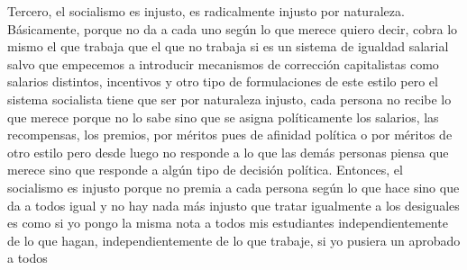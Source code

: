 Tercero, el socialismo es injusto, es radicalmente injusto por naturaleza. Básicamente, porque no da a cada uno según lo que merece quiero decir, cobra lo mismo el que trabaja que el que no trabaja si es un sistema de igualdad salarial salvo que empecemos a introducir mecanismos de corrección capitalistas como salarios distintos, incentivos y otro tipo de formulaciones de este estilo pero el sistema socialista tiene que ser por naturaleza injusto, cada persona no recibe lo que merece porque no lo sabe sino que se asigna políticamente los salarios, las recompensas, los premios, por méritos pues de afinidad política o por méritos de otro estilo pero desde luego no responde a lo que las demás personas piensa que merece sino que responde a algún tipo de decisión política. Entonces, el socialismo es injusto porque no premia a cada persona según lo que hace sino que da a todos igual y no hay nada más injusto que tratar igualmente a los desiguales es como si yo pongo la misma nota a todos mis estudiantes independientemente de lo que hagan, independientemente de lo que trabaje, si yo pusiera un aprobado a todos
